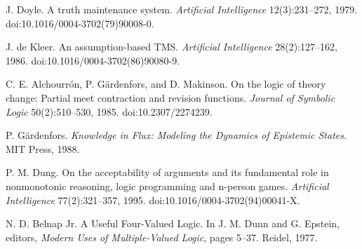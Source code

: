  J. Doyle. A truth maintenance system. \emph{Artificial Intelligence} 12(3):231--272, 1979. doi:10.1016/0004-3702(79)90008-0.

 J. de Kleer. An assumption-based TMS. \emph{Artificial Intelligence} 28(2):127--162, 1986. doi:10.1016/0004-3702(86)90080-9.

 C. E. Alchourr\'on, P. G\"ardenfors, and D. Makinson. On the logic of theory change: Partial meet contraction and revision functions. \emph{Journal of Symbolic Logic} 50(2):510--530, 1985. doi:10.2307/2274239.

 P. G\"ardenfors. \emph{Knowledge in Flux: Modeling the Dynamics of Epistemic States}. MIT Press, 1988.

 P. M. Dung. On the acceptability of arguments and its fundamental role in nonmonotonic reasoning, logic programming and n-person games. \emph{Artificial Intelligence} 77(2):321--357, 1995. doi:10.1016/0004-3702(94)00041-X.

 N. D. Belnap Jr. A Useful Four-Valued Logic. In J. M. Dunn and G. Epstein, editors, \emph{Modern Uses of Multiple-Valued Logic}, pages 5--37. Reidel, 1977.
